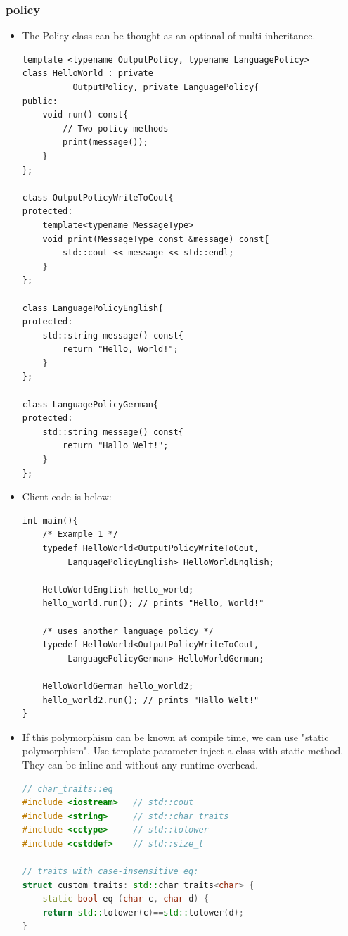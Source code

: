 \documentclass[a4paper,11pt,twoside]{book}
\begin{document}
\subsubsection{policy}
\begin{itemize}
	
	\item The Policy class can be thought as an optional of multi-inheritance. 
	
\begin{lstlisting}[numbers=none]
template <typename OutputPolicy, typename LanguagePolicy>
class HelloWorld : private 
          OutputPolicy, private LanguagePolicy{
public:
	void run() const{
		// Two policy methods
		print(message());
	}
};
	
class OutputPolicyWriteToCout{
protected:
	template<typename MessageType>
	void print(MessageType const &message) const{
		std::cout << message << std::endl;
	}
};
	
class LanguagePolicyEnglish{
protected:
	std::string message() const{
		return "Hello, World!";
	}
};
	
class LanguagePolicyGerman{
protected:
	std::string message() const{
		return "Hallo Welt!";
	}
};
\end{lstlisting}
\item Client code is below:
\begin{lstlisting}[numbers=none]
int main(){
	/* Example 1 */
	typedef HelloWorld<OutputPolicyWriteToCout, 
	     LanguagePolicyEnglish> HelloWorldEnglish;
	
	HelloWorldEnglish hello_world;
	hello_world.run(); // prints "Hello, World!"
	
	/* uses another language policy */
	typedef HelloWorld<OutputPolicyWriteToCout, 
	     LanguagePolicyGerman> HelloWorldGerman;
	
	HelloWorldGerman hello_world2;
	hello_world2.run(); // prints "Hallo Welt!"
}
\end{lstlisting}
	

		\item If this polymorphism can be known at compile time, we can use "static polymorphism". Use template parameter inject a class with static method. They can be inline and without any runtime overhead. 
\begin{lstlisting}[frame=single, language=c++]
// char_traits::eq
#include <iostream>   // std::cout
#include <string>     // std::char_traits
#include <cctype>     // std::tolower
#include <cstddef>    // std::size_t
	
// traits with case-insensitive eq:
struct custom_traits: std::char_traits<char> {
	static bool eq (char c, char d) { 
	return std::tolower(c)==std::tolower(d); 
}
	

\end{lstlisting}
\end{itemize}
\end{document}
